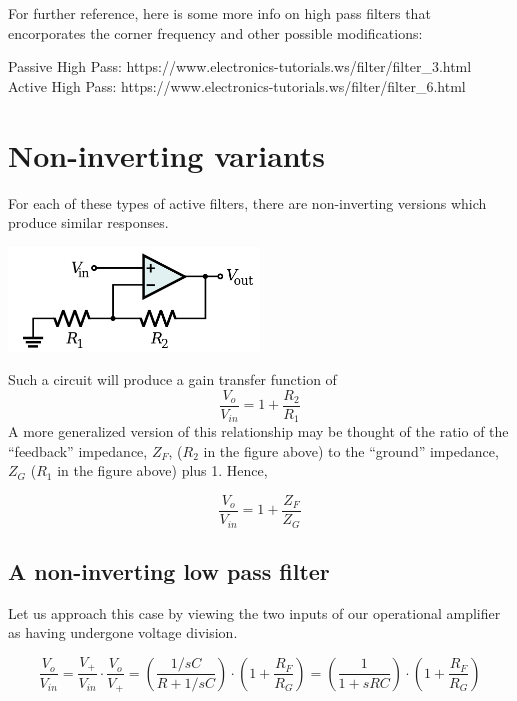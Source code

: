 \documentclass[11pt]{book}
\begin{document}
For further reference, here is some more info on high pass filters that encorporates the corner frequency and other possible modifications:

Passive High Pass: https://www.electronics-tutorials.ws/filter/filter\_3.html
Active High Pass: https://www.electronics-tutorials.ws/filter/filter\_6.html

\section{Non-inverting variants}
For each of these types of active filters, there are non-inverting versions which produce similar responses.

\begin{center}
	\includegraphics[width=0.5\textwidth]{figures/15.06.png}
\end{center}

Such a circuit will produce a gain transfer function of 
\begin{equation}
	\frac{V_o}{V_{in}} = 1 + \frac{R_2}{R_1}
\end{equation}
A more generalized version of this relationship may be thought of the ratio of the ``feedback'' impedance, $Z_F$, ($R_2$ in the figure above) to the ``ground'' impedance, $Z_G$ ($R_1$ in the figure above) plus 1. Hence,

\begin{equation}
	\frac{V_o}{V_{in}} = 1 + \frac{Z_F}{Z_G}
\end{equation}


\subsection{A non-inverting low pass filter}

Let us approach this case by viewing the two inputs of our operational amplifier as having undergone voltage division.

\begin{equation}
	\frac{V_o}{V_{in}} = \frac{V_+}{V_{in}}\cdot \frac{V_o}{V_+} = \left(\frac{1/sC}{R+ 1/sC}\right)\cdot\left(1+ \frac{R_F}{R_G}\right) = \left(\frac{1}{1 + sRC}\right)\cdot\left(1+ \frac{R_F}{R_G}\right) 
\end{equation}
\end{document}
